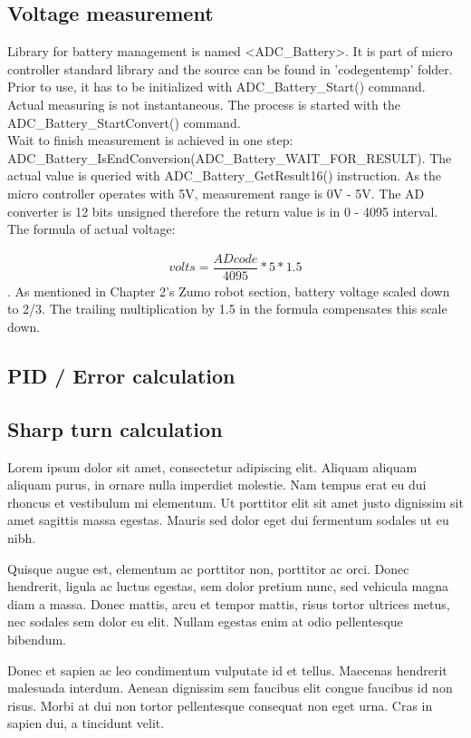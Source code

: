 \documentclass[11pt,a4paper,oneside,article]{memoir}
\begin{document}
\subsection{Voltage measurement}
\begin{sloppypar}
Library for battery management is named \textless ADC\_Battery\textgreater . It is part of micro controller standard library and the source can be found in 'codegentemp' folder. Prior to use, it has to be initialized with ADC\_Battery\_Start() command.
Actual measuring is not instantaneous. The process is started with the ADC\_Battery\_StartConvert() command.\\
Wait to finish measurement is achieved in one step: ADC\_Battery\_IsEndConversion(ADC\_Battery\_WAIT\_FOR\_RESULT).
The actual value is queried with ADC\_Battery\_GetResult16() instruction. As the micro controller operates with 5V, measurement range is 0V - 5V. The AD converter is 12 bits unsigned therefore the return value is in 0 - 4095 interval. The formula of actual voltage:
\end{sloppypar}
\begin{align}
volts = \dfrac{AD code}{4095} * 5 * 1.5
\end{align}
. As mentioned in Chapter 2's Zumo robot section, battery voltage scaled down to 2/3. The trailing multiplication by 1.5 in the formula compensates this scale down.

\subsection{PID / Error calculation}

\subsection{Sharp turn calculation}
Lorem ipsum dolor sit amet, consectetur adipiscing elit. Aliquam aliquam aliquam purus, in ornare nulla imperdiet molestie. Nam tempus erat eu dui rhoncus et vestibulum mi elementum. Ut porttitor elit sit amet justo dignissim sit amet sagittis massa egestas. Mauris sed dolor eget dui fermentum sodales ut eu nibh. 

Quisque augue est, elementum ac porttitor non, porttitor ac orci. Donec hendrerit, ligula ac luctus egestas, sem dolor pretium nunc, sed vehicula magna diam a massa. Donec mattis, arcu et tempor mattis, risus tortor ultrices metus, nec sodales sem dolor eu elit. Nullam egestas enim at odio pellentesque bibendum. 

Donec et sapien ac leo condimentum vulputate id et tellus. Maecenas hendrerit malesuada interdum. Aenean dignissim sem faucibus elit congue faucibus id non risus. Morbi at dui non tortor pellentesque consequat non eget urna. Cras in sapien dui, a tincidunt velit.
\end{document}
